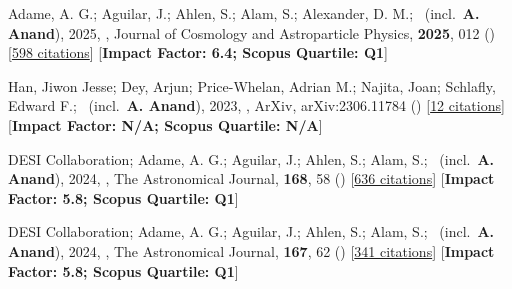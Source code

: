 \item[{\color{numcolor}\scriptsize4}] Adame, A. G.; Aguilar, J.; Ahlen, S.; Alam, S.; Alexander, D. M.; \etal\ (incl.\ \textbf{A. Anand}), 2025, , Journal of Cosmology and Astroparticle Physics, \textbf{2025}, 012 () [\href{https://ui.adsabs.harvard.edu/abs/2025JCAP...04..012A}{598 citations}] [\textbf{Impact Factor: 6.4; Scopus Quartile: Q1}]

\item[{\color{numcolor}\scriptsize3}] Han, Jiwon Jesse; Dey, Arjun; Price-Whelan, Adrian M.; Najita, Joan; Schlafly, Edward F.; \etal\ (incl.\ \textbf{A. Anand}), 2023, , ArXiv, arXiv:2306.11784 () [\href{https://ui.adsabs.harvard.edu/abs/2023arXiv230611784H}{12 citations}] [\textbf{Impact Factor: N/A; Scopus Quartile: N/A}]

\item[{\color{numcolor}\scriptsize2}] DESI Collaboration; Adame, A. G.; Aguilar, J.; Ahlen, S.; Alam, S.; \etal\ (incl.\ \textbf{A. Anand}), 2024, , The Astronomical Journal, \textbf{168}, 58 () [\href{https://ui.adsabs.harvard.edu/abs/2024AJ....168...58D}{636 citations}] [\textbf{Impact Factor: 5.8; Scopus Quartile: Q1}]

\item[{\color{numcolor}\scriptsize1}] DESI Collaboration; Adame, A. G.; Aguilar, J.; Ahlen, S.; Alam, S.; \etal\ (incl.\ \textbf{A. Anand}), 2024, , The Astronomical Journal, \textbf{167}, 62 () [\href{https://ui.adsabs.harvard.edu/abs/2024AJ....167...62D}{341 citations}] [\textbf{Impact Factor: 5.8; Scopus Quartile: Q1}]